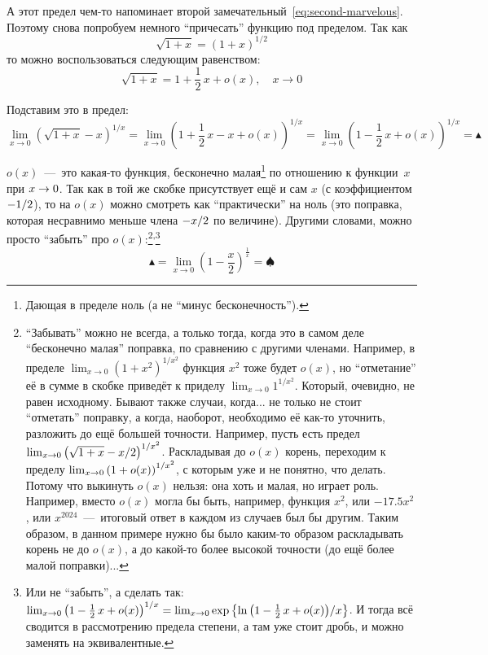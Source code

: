 \documentclass[a4paper,12pt]{article}
\begin{document}
  \begin{solution}
    А этот предел чем-то напоминает второй замечательный~\eqref{eq:second-marvelous}.
    Поэтому снова попробуем немного ``причесать'' функцию под пределом.
    Так как
    \[
      \sqrt{1 + x} = (1 + x)^{1/2}
    \]
    то можно воспользоваться следующим равенством:
    \[
      \sqrt{1 + x} = 1 + \frac{1}{2}\, x + o(x),\quad x \to 0
    \]

    Подставим это в предел:
    \[
      \lim_{x \to 0} \left(\sqrt{1 + x} - x\right)^{1 / x}
        = \lim_{x \to 0} \left(1 + \frac{1}{2}\, x - x + o(x)\right)^{1 / x}
        = \lim_{x \to 0} \left(1 - \frac{1}{2}\, x + o(x)\right)^{1 / x}
        = \blacktriangle
    \]

    $o(x)$~---~это какая-то функция, бесконечно малая\footnote{
      Дающая в пределе ноль (а не ``минус бесконечность'').
    } по отношению к функции~$x$ при $x \hm\to 0$.
    Так как в той же скобке присутствует ещё и сам $x$ (с коэффициентом $-1\hm/2$), то на $o(x)$ можно смотреть как ``практически'' на ноль (это поправка, которая несравнимо меньше члена $-x\hm/2$ по величине).
    Другими словами, можно просто ``забыть'' про $o(x)$:\footnote{
      ``Забывать'' можно не всегда, а только тогда, когда это в самом деле ``бесконечно малая'' поправка, по сравнению с другими членами. 
      Например, в пределе $\lim_{x \to 0} \left(1 + x^2\right)^{1/x^2}$ функция $x^2$ тоже будет $o(x)$, но ``отметание'' её в сумме в скобке приведёт к приделу $\lim_{x \to 0} 1^{1/x^2}$.
      Который, очевидно, не равен исходному.
      Бывают также случаи, когда... не только не стоит ``отметать'' поправку, а когда, наоборот, необходимо её как-то уточнить, разложить до ещё большей точности.
      Например, пусть есть предел $\lim_{x \to 0} \left(\sqrt{1 + x} \hm- x \hm/ 2\right)^{1/x^2}$.
      Раскладывая до $o(x)$ корень, переходим к пределу $\lim_{x \to 0} \left(1 \hm+ o(x)\right)^{1/x^2}$, с которым уже и не понятно, что делать.
      Потому что выкинуть $o(x)$ нельзя: она хоть и малая, но играет роль.
      Например, вместо $o(x)$ могла бы быть, например, функция $x^2$, или $-17{.}5 x^2$, или $x^{2024}$~---~итоговый ответ в каждом из случаев был бы другим.
      Таким образом, в данном примере нужно бы было каким-то образом раскладывать корень не до $o(x)$, а до какой-то более высокой точности (до ещё более малой поправки)...
    }\textsuperscript{,}\footnote{
      Или не ``забыть'', а сделать так:
      $\lim_{x \to 0} \left(1 \hm- \frac{1}{2}\, x \hm+ o(x)\right)^{1 \hm/ x} \hm= \lim_{x \to 0} \exp\left\{ \ln{\left(1 \hm- \frac{1}{2}\, x \hm+ o(x)\right)} \hm/ x \right\}$.
      И тогда всё сводится в рассмотрению предела степени, а там уже стоит дробь, и можно заменять на эквивалентные.
    }
    \[
      \blacktriangle = \lim_{x \to 0} \left(1 - \frac{x}{2}\right)^{\frac{1}{x}} = \spadesuit
    \]


\end{solution}
\end{document}
